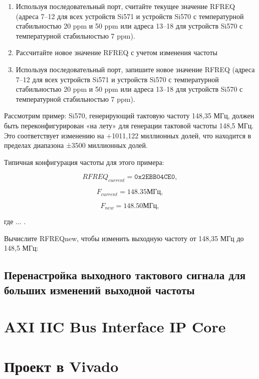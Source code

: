 \documentclass[a4paper,oneside ,10pt]{extreport}
\begin{document}
\begin{enumerate}
	\item Используя последовательный порт, считайте текущее значение RFREQ (адреса 7–12 для всех устройств Si571 и устройств Si570 с температурной стабильностью 20 ppm и 50 ppm или адреса 13–18 для устройств Si570 с температурной стабильностью 7 ppm).
	\item Рассчитайте новое значение RFREQ с учетом изменения частоты
	\item Используя последовательный порт, запишите новое значение RFREQ (адреса 7–12 для всех устройств Si571 и устройств Si570 с температурной стабильностью 20 ppm и 50 ppm или адреса 13–18 для устройств Si570 с температурной стабильностью 7 ppm).
\end{enumerate}

Рассмотрим пример:
Si570, генерирующий тактовую частоту 148,35 МГц, должен быть переконфигурирован «на лету» для генерации тактовой частоты 148,5 МГц. Это соответствует изменению на +1011,122 миллионных долей, что находится в пределах диапазона ±3500 миллионных долей.

Типичная конфигурация частоты для этого примера:

\begin{equation}	
	RFREQ_{current} =  \mathtt{0x2EBB04CE0},
\end{equation}

\begin{equation}	
	F_{current} =  148.35 МГц,
\end{equation}

\begin{equation}	
	F_{new} =  148.50 МГц,
\end{equation}

где ...  .

Вычислите RFREQnew, чтобы изменить выходную частоту от 148,35 МГц до 148,5 МГц:

\subsection{Перенастройка выходного тактового сигнала для больших изменений выходной частоты}

\section{AXI IIC Bus Interface IP Core}

\section{Проект в Vivado}
\end{document}
